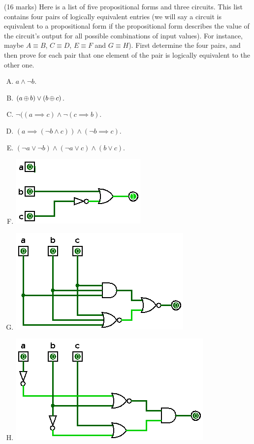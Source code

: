 \item (16 marks)  Here is  a list  of  five propositional  forms  and three  circuits. This  list
  contains four pairs of logically equivalent entries (we will say a circuit is equivalent
  to a propositional form  if the propositional form describes the  value of the circuit's
  output for all possible combinations of input values). For instance, maybe $A \equiv B$,
  $C \equiv D$, $E  \equiv F$ and $G \equiv H$). First determine  the four pairs, and then
  prove for each  pair that one element of  the pair is logically equivalent  to the other
  one.
  \begin{enumerate}[(A)]
  \item $a \land \lnot b$.
  \item $(a \mathop{\oplus} b) \lor (b \mathop{\oplus} c)$.
  \item $\lnot ((a \implies c) \wedge \lnot (c \implies b)$.
  \item $(a \implies (\lnot b \land c)) \land (\lnot b \implies c)$.
  \item $(\lnot a \lor \lnot b) \land (\lnot a \lor c) \land (b \lor c)$.
  \item \leavevmode{}\hbox{\includegraphics[scale=0.5]{ass1-q3f.png}}
  \item \leavevmode{}\hbox{\includegraphics[scale=0.5]{ass1-q3g.png}}
  \item \leavevmode{}\hbox{\includegraphics[scale=0.5]{ass1-q3h.png}}
  \end{enumerate}

